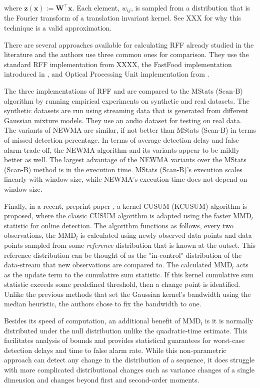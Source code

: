 where $\mathbf{z}(\mathbf{x}):=\mathbf{W}^{\top} \mathbf{x}$. Each element, $w_{ij}$, is sampled from a distribution that is the Fourier transform of a translation invariant kernel. See XXX for why this technique is a valid approximation.

There are several approaches available for calculating RFF already studied in the literature and the authors use three common ones for comparison. They use the standard RFF implementation from XXXX, the FastFood implementation introduced in \cite{le2014fastfood}, and Optical Processing Unit implementation from \cite{saade2016random}. 

The three implementations of RFF and are compared to the MStats (Scan-B) algorithm by running empirical experiments on synthetic and real datasets. The synthetic datasets are run using streaming data that is generated from different Gaussian mixture models. They use an audio dataset for testing on real data. The variants of NEWMA are similar, if not better than MStats (Scan-B) in terms of missed detection percentage. In terms of average detection delay and false alarm trade-off, the NEWMA algorithm and its variants appear to be mildly better as well. The largest advantage of the NEWMA variants over the MStats (Scan-B) method is in the execution time. MStats (Scan-B)'s execution scales linearly with window size, while NEWMA's execution time does not depend on window size.

Finally, in a recent, preprint paper \cite{flynn2019change}, a kernel CUSUM (KCUSUM) algorithm is proposed, where the classic CUSUM algorithm is adapted using the faster MMD$_l$ statistic for online detection. The algorithm functions as follows, every two observations, the MMD$_l$ is calculated using newly observed data points and data points sampled from some \textit{reference} distribution that is known at the outset. This reference distribution can be thought of as the "in-control" distribution of the data-stream that new observations are compared to. The calculated MMD$_l$ acts as the update term to the cumulative sum statistic. If this kernel cumulative sum statistic exceeds some predefined threshold, then a change point is identified. Unlike the previous methods that set the Gaussian kernel's bandwidth using the median heuristic, the authors chose to fix the bandwidth to one.

Besides its speed of computation, an additional benefit of MMD$_l$ is it is normally distributed under the null distribution unlike the quadratic-time estimate. This facilitates analysis of bounds and provides statistical guarantees for worst-case detection delays and time to false alarm rate. While this non-parametric approach can detect any change in the distribution of a sequence, it does struggle with more complicated distributional changes such as variance changes of a single dimension and changes beyond first and second-order moments.

